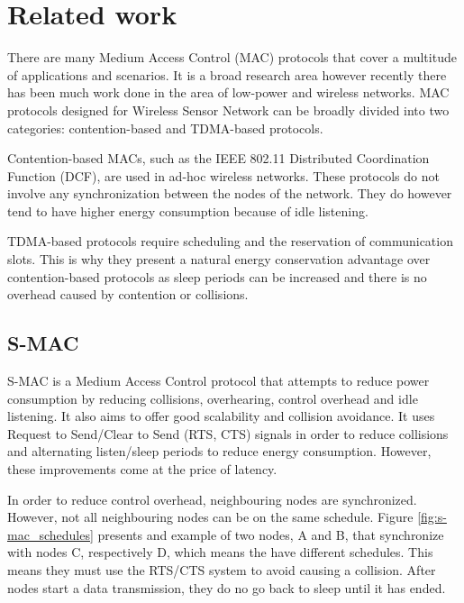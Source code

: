 
\chapter{Related work}

There are many Medium Access Control (MAC) protocols that cover a multitude of
applications and scenarios. It is a broad research area however recently there
has been much work done in the area of low-power and wireless networks. MAC
protocols designed for Wireless Sensor Network can be broadly divided into two
categories: contention-based and TDMA-based protocols.

Contention-based MACs, such as the IEEE 802.11 Distributed Coordination
Function\cite{ieee1997wireless} (DCF), are used in ad-hoc wireless networks.
These protocols do not involve any synchronization between the nodes of the
network. They do however tend to have higher energy consumption because of idle
listening.

TDMA-based protocols require scheduling and the reservation of communication
slots. This is why they present a natural energy conservation advantage over
contention-based protocols as sleep periods can be increased and there is no
overhead caused by contention or collisions.

\section{S-MAC}

S-MAC\cite{ye2004medium} is a Medium Access Control protocol that attempts to
reduce power consumption by reducing collisions, overhearing, control overhead
and idle listening. It also aims to offer good scalability and collision
avoidance. It uses Request to Send/Clear to Send (RTS, CTS) signals in order to
reduce collisions and alternating listen/sleep periods to reduce energy
consumption. However, these improvements come at the price of latency. 

In order to reduce control overhead, neighbouring nodes are synchronized.
However, not all neighbouring nodes can be on the same schedule.  Figure
\ref{fig:s-mac_schedules} presents and example of two nodes, A and B, that
synchronize with nodes C, respectively D, which means the have different
schedules. This means they must use the RTS/CTS system to avoid causing a
collision. After nodes start a data transmission, they do no go back to sleep
until it has ended.

